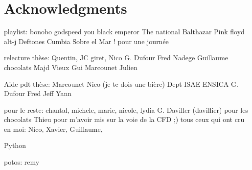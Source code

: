 
\chapter*{Acknowledgments}
\thispagestyle{empty}

playlist:
bonobo
godspeed you black emperor
The national
Balthazar
Pink floyd
alt-j
Deftones
Cumbia Sobre el Mar ! pour une journée

relecture thèse:
Quentin,
JC giret,
Nico
G. Dufour
Fred
Nadege
Guillaume chocolats
Majd
Vieux Gui
Marcounet
Julien

Aide pdt thèse:
Marcounet
Nico (je te dois une bière)
Dept ISAE-ENSICA
G. Dufour
Fred
Jeff
Yann

pour le reste:
chantal, michele, marie, nicole, lydia
G. Daviller (davillier) pour les chocolats
Thieu pour m'avoir mis sur la voie de la CFD ;)
tous ceux qui ont cru en moi: Nico, Xavier, Guillaume, 

Python 

potos:
remy